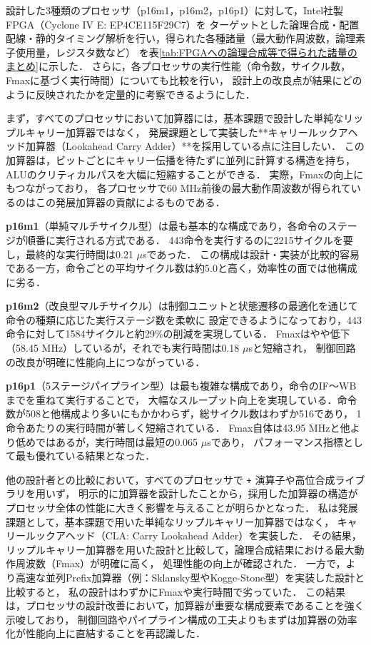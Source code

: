 \documentclass[autodetect-engine,dvi=dvipdfmx,ja=standard,
               a4j,11pt]{bxjsarticle}
\begin{document}
設計した3種類のプロセッサ（p16m1，p16m2，p16p1）に対して，Intel社製FPGA（Cyclone IV E: EP4CE115F29C7）を
ターゲットとした論理合成・配置配線・静的タイミング解析を行い，得られた各種諸量（最大動作周波数，論理素子使用量，レジスタ数など）
を表\ref{tab:FPGAへの論理合成等で得られた諸量のまとめ}に示した．
さらに，各プロセッサの実行性能（命令数，サイクル数，Fmaxに基づく実行時間）についても比較を行い，
設計上の改良点が結果にどのように反映されたかを定量的に考察できるようにした．

まず，すべてのプロセッサにおいて加算器には，基本課題で設計した単純なリップルキャリー加算器ではなく，
発展課題として実装した**キャリールックアヘッド加算器（Lookahead Carry Adder）**を採用している点に注目したい．
この加算器は，ビットごとにキャリー伝播を待たずに並列に計算する構造を持ち，ALUのクリティカルパスを大幅に短縮することができる．
実際，Fmaxの向上にもつながっており，
各プロセッサで60 MHz前後の最大動作周波数が得られているのはこの発展加算器の貢献によるものである．

\textbf{p16m1}（単純マルチサイクル型）は最も基本的な構成であり，各命令のステージが順番に実行される方式である．
443命令を実行するのに2215サイクルを要し，最終的な実行時間は0.21 $\mu$sであった．
この構成は設計・実装が比較的容易である一方，命令ごとの平均サイクル数は約5.0と高く，効率性の面では他構成に劣る．

\textbf{p16m2}（改良型マルチサイクル）は制御ユニットと状態遷移の最適化を通じて命令の種類に応じた実行ステージ数を柔軟に
設定できるようになっており，443命令に対して1584サイクルと約29\%の削減を実現している．
Fmaxはやや低下（58.45 MHz）しているが，それでも実行時間は0.18 $\mu$sと短縮され，
制御回路の改良が明確に性能向上につながっている．

\textbf{p16p1}（5ステージパイプライン型）は最も複雑な構成であり，命令のIF～WBまでを重ねて実行することで，
大幅なスループット向上を実現している．命令数が508と他構成より多いにもかかわらず，総サイクル数はわずか516であり，
1命令あたりの実行時間が著しく短縮されている．
Fmax自体は43.95 MHzと他より低めではあるが，実行時間は最短の0.065 $\mu$sであり，
パフォーマンス指標として最も優れている結果となった．

他の設計者との比較において，すべてのプロセッサで \texttt{+} 演算子や高位合成ライブラリを用いず，
明示的に加算器を設計したことから，採用した加算器の構造がプロセッサ全体の性能に大きく影響を与えることが明らかとなった．
私は発展課題として，基本課題で用いた単純なリップルキャリー加算器ではなく，
キャリールックアヘッド（CLA: Carry Lookahead Adder）を実装した．
その結果，リップルキャリー加算器を用いた設計と比較して，論理合成結果における最大動作周波数（Fmax）が明確に高く，
処理性能の向上が確認された．
一方で，より高速な並列Prefix加算器（例：Sklansky型やKogge-Stone型）を実装した設計と比較すると，
私の設計はわずかにFmaxや実行時間で劣っていた．
この結果は，プロセッサの設計改善において，加算器が重要な構成要素であることを強く示唆しており，
制御回路やパイプライン構成の工夫よりもまずは加算器の効率化が性能向上に直結することを再認識した．
\end{document}
